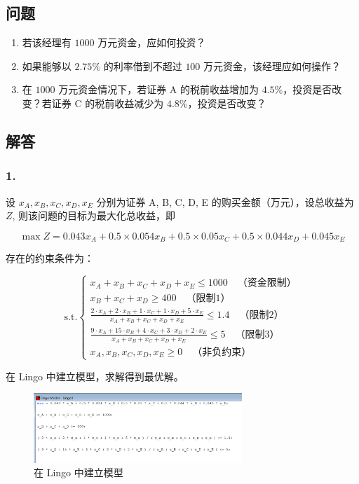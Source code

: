\documentclass{article}
\begin{document}
\subsection*{问题}
\begin{enumerate}
    \item 若该经理有 $1000$ 万元资金，应如何投资？
    \item 如果能够以 $2.75\%$ 的利率借到不超过 $100$ 万元资金，该经理应如何操作？
    \item 在 $1000$ 万元资金情况下，若证券 A 的税前收益增加为 $4.5\%$，投资是否改变？若证券 C 的税前收益减少为 $4.8\%$，投资是否改变？
\end{enumerate}

\subsection*{{\heiti 解答}}

\subsubsection*{1.}

设 $x_A, x_B, x_C, x_D, x_E$ 分别为证券 A, B, C, D, E 的购买金额（万元），设总收益为 $Z$, 则该问题的目标为最大化总收益，即

$$
\max Z = 0.043 x_A + 0.5 \times 0.054 x_B + 0.5 \times 0.05 x_C + 0.5 \times 0.044 x_D + 0.045 x_E
$$

存在的约束条件为：

$$
\text{s.t.} 
\begin{cases}
    x_A + x_B + x_C + x_D + x_E \leq 1000 \quad \text{（资金限制）} \\
    x_B + x_C + x_D \geq 400 \quad \text{（限制1）} \\
    \frac{2 \cdot x_A + 2 \cdot x_B + 1 \cdot x_C + 1 \cdot x_D + 5 \cdot x_E}{x_A + x_B + x_C + x_D + x_E} \leq 1.4 \quad \text{（限制2）} \\
    \frac{9 \cdot x_A + 15 \cdot x_B + 4 \cdot x_C + 3 \cdot x_D + 2 \cdot x_E}{x_A + x_B + x_C + x_D + x_E} \leq 5 \quad \text{（限制3）} \\
    x_A, x_B, x_C, x_D, x_E \geq 0 \quad \text{（非负约束）}
\end{cases}
$$

在 Lingo 中建立模型，求解得到最优解。

\begin{figure}[H]
\centering
\includegraphics[width=0.7\textwidth]{img/1.png}
\caption{在 Lingo 中建立模型}
\end{figure}
\end{document}
